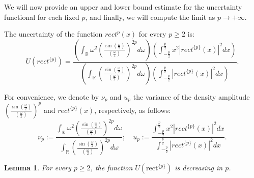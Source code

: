 \documentclass[preprint,hidelinks,authoryear]{elsarticle}
\newtheorem{Lemma}[Thm]{Lemma}
\theoremstyle{plain}
\theoremstyle{definition}
\theoremstyle{remark}
\begin{document}
We will now provide an upper and lower bound estimate for the uncertainty functional for each fixed $p$, and finally, we will compute the limit as $p \to +\infty$.

The uncertainty of the function $rect^{{p}}(x)$ for every $p \ge 2$ is:
\begin{equation}
    U(rect^{\{p\}})=\displaystyle\frac{\left(\displaystyle\int_{\mathbb{R}} \omega^2\left(\displaystyle\frac{\sin{\displaystyle
    \left(\frac{\omega}{2}\right)}}{\left(\displaystyle
    \frac{\omega}{2}\right)}\right)^{2p} d\omega\right )\left(\displaystyle\int_{-\frac{p}{2}}^{\frac{p}{2}}x^2|rect^{\{p\}}(x)|^2 dx\right)}{\left(\displaystyle\int_{\mathbb{R}} \left(\displaystyle\frac{\sin{\displaystyle
    \left(\frac{\omega}{2}\right)}}{\left(\displaystyle
    \frac{\omega}{2}\right)}\right)^{2p} d\omega\right )\left(\displaystyle\int_{-\frac{p}{2}}^{\frac{p}{2}}|rect^{\{p\}}(x)|^2 dx\right)}.
    \label{incertezzacorretta rect}
\end{equation}

For convenience, we denote by $\nu_p$ and $u_p$ the variance of the density amplitude $\left(\displaystyle\frac{\sin{\displaystyle
    \left(\frac{\omega}{2}\right)}}{\left(\displaystyle
    \frac{\omega}{2}\right)}\right)^{p} $ and $rect^{\{p\}}(x)$, respectively, as follows:
 \begin{equation}
        \nu_p:=\displaystyle\frac{\displaystyle\int_{\mathbb{R}} \omega^2\left(\displaystyle\frac{\sin{\displaystyle
    \left(\frac{\omega}{2}\right)}}{\left(\displaystyle
    \frac{\omega}{2}\right)}\right)^{2p} d\omega}{\displaystyle\int_{\mathbb{R}} \left(\displaystyle\frac{\sin{\displaystyle
    \left(\frac{\omega}{2}\right)}}{\left(\displaystyle
    \frac{\omega}{2}\right)}\right)^{2p} d\omega}; \quad 
    u_p:=\displaystyle\frac{\displaystyle\int_{-\frac{p}{2}}^{\frac{p}{2}}x^2|rect^{\{p\}}(x)|^2 dx}{\displaystyle\int_{-\frac{p}{2}}^{\frac{p}{2}}|rect^{\{p\}}(x)|^2 dx}.
    \end{equation} 




\begin{Lemma}
\label{lemma:decreasing}
    For every $p \ge 2$, the function $U(\text{rect}^{\{p\}})$ is decreasing in $p$.
\end{Lemma}
\end{document}
